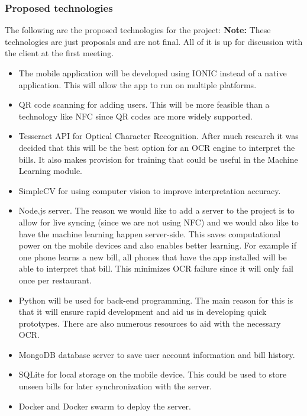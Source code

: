 \documentclass{article}
\begin{document}
        \subsubsection{Proposed technologies}
        The following are the proposed technologies for the project:\newline
        \textbf{Note:} These technologies are just proposals and are not final. All of it is up for discussion with the client at the first meeting.
        \begin{itemize}
        	\item The mobile application will be developed using IONIC instead of a native application. This will allow the app to run on multiple platforms.
        	\item QR code scanning for adding users. This will be more feasible than a technology like NFC since QR codes are more widely supported.
        	\item Tesseract API for Optical Character Recognition. After much research it was decided that this will be the best option for an OCR engine to interpret the bills. It also makes provision for training that could be useful in the Machine Learning module.
        	\item SimpleCV for using computer vision to improve interpretation accuracy.
        	\item Node.js server. The reason we would like to add a server to the project is to allow for live syncing (since we are not using NFC) and we would also like to have the machine learning happen server-side. This saves computational power on the mobile devices and also enables better learning. For example if one phone learns a new bill, all phones that have the app installed will be able to interpret that bill. This minimizes OCR failure since it will only fail once per restaurant. 
        	        \item Python will be used for back-end programming. The main reason for this is that it will ensure rapid development and aid us in developing quick prototypes. There are also numerous resources to aid with the necessary OCR.
        	\item MongoDB database server to save user account information and bill history.
        	\item SQLite for local storage on the mobile device. This could be used to store unseen bills for later synchronization with the server.
        	\item Docker and Docker swarm to deploy the server. 
        \end{itemize}
\end{document}
